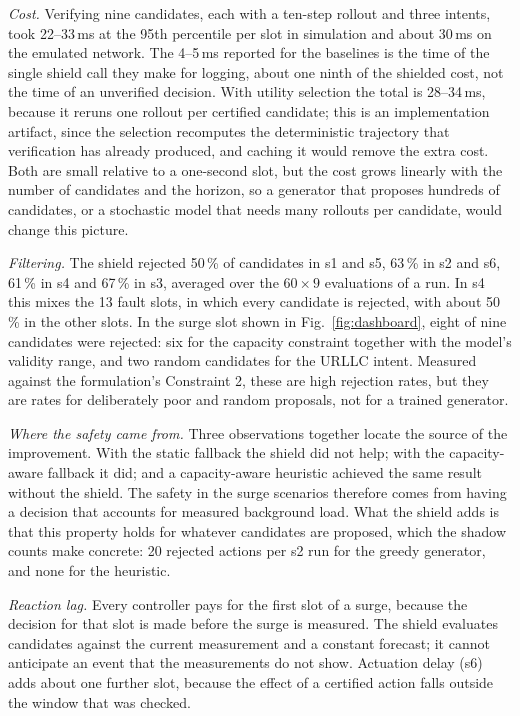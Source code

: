 \emph{Cost.} Verifying nine candidates, each with a ten-step rollout and three
intents, took 22--33\,ms at the 95th percentile per slot in simulation and about
30\,ms on the emulated network. The 4--5\,ms reported for the baselines is the time of
the single shield call they make for logging, about one ninth of the shielded cost,
not the time of an unverified decision. With utility selection the total is 28--34\,ms, because it reruns one rollout per
certified candidate; this is an implementation artifact, since the
selection recomputes the deterministic trajectory that verification has already
produced, and caching it would remove the extra cost. Both are small relative to a one-second slot, but the cost grows
linearly with the number of candidates and the horizon, so a generator that
proposes hundreds of candidates, or a stochastic model that needs many rollouts per
candidate, would change this picture.

\emph{Filtering.} The shield rejected 50\,\% of candidates in s1 and s5, 63\,\% in
s2 and s6, 61\,\% in s4 and 67\,\% in s3, averaged over the $60\times9$ evaluations
of a run. In s4 this mixes the 13 fault slots, in which every candidate is rejected,
with about 50\,\% in the other slots. In the surge slot shown in Fig.~\ref{fig:dashboard}, eight of nine candidates were
rejected: six for the capacity constraint together with the model's validity range,
and two random candidates for the URLLC intent. Measured against the formulation's Constraint 2, these are high rejection
rates, but they are rates for deliberately poor and random proposals, not for a
trained generator.

\emph{Where the safety came from.} Three observations together locate the source of
the improvement. With the static fallback the shield did not help; with the
capacity-aware fallback it did; and a capacity-aware heuristic achieved the same
result without the shield. The safety in the surge scenarios therefore comes from
having a decision that accounts for measured background load. What the shield adds
is that this property holds for whatever candidates are proposed, which the shadow
counts make concrete: 20 rejected actions per s2 run for the greedy generator, and
none for the heuristic.

\emph{Reaction lag.} Every controller pays for the first slot of a surge, because
the decision for that slot is made before the surge is measured. The shield
evaluates candidates against the current measurement and a constant forecast; it
cannot anticipate an event that the measurements do not show. Actuation delay (s6)
adds about one further slot, because the effect of a certified action falls outside
the window that was checked.


